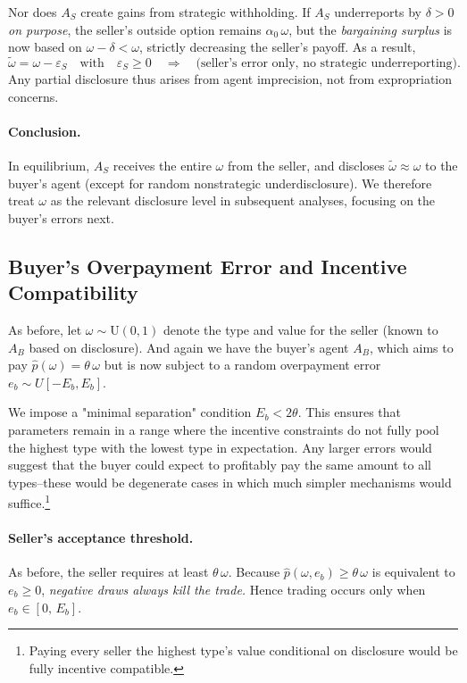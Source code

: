 \documentclass{article}
\begin{document}
Nor does $A_S$ create gains from strategic withholding. If $A_S$ underreports by $\delta>0$ \emph{on purpose}, 
the seller’s outside option remains $\alpha_0\,\omega$, but the \emph{bargaining surplus} is now based on $\omega-\delta < \omega$, strictly decreasing the seller’s payoff. As a result, 
\[
  \tilde{\omega} = \omega - \varepsilon_S
  \quad\text{with}\quad \varepsilon_S \ge 0
  \quad\Longrightarrow\quad \text{(seller’s error only, no strategic underreporting).}
\]
Any partial disclosure thus arises from agent imprecision, 
not from expropriation concerns.  

\paragraph{Conclusion.}
In equilibrium, $A_S$ receives the entire $\omega$ from the seller, 
and discloses $\tilde{\omega} \approx \omega$ to the buyer’s agent 
(except for random nonstrategic underdisclosure). We therefore treat $\omega$ as the 
relevant disclosure level in subsequent analyses, focusing on the 
buyer’s  errors next.

\subsection{Buyer’s Overpayment Error and Incentive Compatibility}

As before, let $\omega \sim \mathrm{U}(0,1)$ denote the type and value for the seller (known to $A_B$ based on disclosure). And again we have the buyer’s agent $A_B$, which aims to pay \(\hat{p}(\omega)=\theta\,\omega\) but is now subject to a random overpayment error $e_b \sim U[-E_b,E_b]$. 

We impose a "minimal separation" condition $E_b<2\theta$. This ensures that parameters remain in a range where the incentive constraints do not fully pool the highest type with the lowest type in expectation. Any larger errors would suggest that the buyer could expect to profitably pay the same amount to all types--these would be degenerate cases in which much simpler mechanisms would suffice.\footnote{Paying every seller the highest type's value conditional on disclosure would be fully incentive compatible.}

\paragraph{Seller’s acceptance threshold.}
As before, the seller requires at least \(\theta\,\omega\).  Because
\(\hat{p}(\omega,e_b) \ge \theta\,\omega\) is equivalent to \(e_b \ge 0\), 
\emph{negative draws always kill the trade.}  
Hence trading occurs only when \(e_b \in [0,\,E_b]\).  
\end{document}
